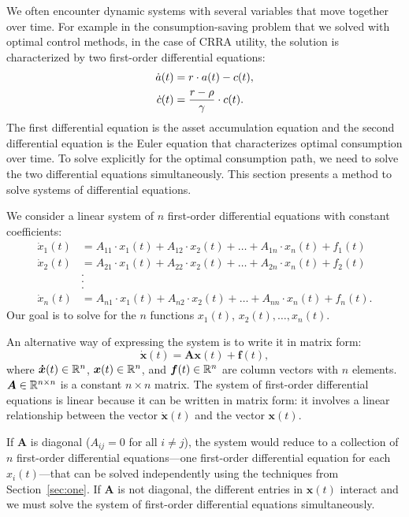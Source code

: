 \documentclass[letterpaper,12pt,leqno]{article}
\begin{document}
We often encounter dynamic systems with several variables that move together over time. For example in the consumption-saving problem that we solved with optimal control methods, in the case of CRRA utility, the solution is characterized by two first-order differential equations:
\begin{align*}
\dot{a}(t) &=r\cdot a(t)-c(t), \\
\dot{c}(t) &=\frac{r-\rho}{\gamma}\cdot  c(t).
\end{align*}
The first differential equation is the asset accumulation equation and the second differential equation is the Euler equation that characterizes optimal consumption over time. To solve explicitly for the optimal consumption path, we need to solve the two differential equations
simultaneously. This section presents a method to solve systems of differential equations.

We consider a linear system of $n$ first-order differential equations with constant coefficients:
\begin{align*}
\dot{x}_{1}(t) &=A_{11}\cdot x_{1}(t)+A_{12}\cdot x_{2}(t)+\ldots+A_{1n}\cdot x_{n}(t) +f_{1}(t) \\
\dot{x}_{2}(t) &=A_{21}\cdot x_{1}(t)+A_{22}\cdot x_{2}(t)+\ldots+A_{2n}\cdot x_{n}(t) +f_{2}(t) \\
&. \\
&. \\
&. \\
\dot{x}_{n}(t) &=A_{n1}\cdot x_{1}(t)+A_{n2}\cdot x_{2}(t)+\ldots+A_{nn}\cdot x_{n}(t) +f_{n}(t).
\end{align*}
Our goal is to solve for the $n$ functions $x_{1}(t)$, $x_{2}(t),\ldots, x_{n}(t)$.

An alternative way of expressing the system is to write it in matrix form:
\begin{equation}
\bm{\dot{x}}(t) =\bm{A}  \bm{x}(t) +\bm{f}(t), \label{eq:FODEsys}
\end{equation}
where $\bm{\dot{x}}(t) \in \mathbb{R}^{n}$, $\bm{x}(t) \in \mathbb{R}^{n}$, and $\bm{f}(t) \in \mathbb{R}^{n}$ are column vectors with $n$ elements. $\bm{A}\in \mathbb{R}^{n\times n}$ is a constant $n\times n$ matrix. The system of first-order differential equations is linear because it can be written in matrix form: it involves a linear relationship between the vector $\bm{\dot{x}}(t)$ and the vector $\bm{x}(t)$.

If $\bm{A}$ is diagonal ($A_{ij}=0$ for all $i\neq j$), the system would reduce to a collection of $n$ first-order differential equations---one first-order differential equation for each  $x_{i}(t)$---that can be solved independently using the techniques from Section~\ref{sec:one}.
If $\bm{A}$ is not diagonal, the different entries in $\bm{x}(t)$ interact and we must solve the system of first-order differential equations simultaneously.
\end{document}

